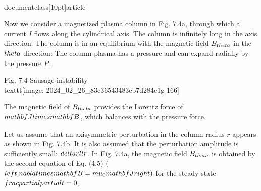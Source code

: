 \\documentclass[10pt]{article}
\begin{document}
{{{{Now we consider a magnetized plasma column in Fig. 7.4a, through which a current $I$ flows along the cylindrical axis. The column is infinitely long in the axis direction. The column is in an equilibrium with the magnetic field $B_{\\theta}$ in the $\\theta$ direction: The column plasma has a pressure and can expand radially by the pressure $P$.

Fig. 7.4 Sausage instability
\\texttt{[image: 2024\_02\_26\_83e36543483eb7d284c1g-166]}

The magnetic field of $B_{\\theta}$ provides the Lorentz force of $\\mathbf{J} \\times \\mathbf{B}$, which balances with the pressure force.

Let us assume that an axisymmetric perturbation in the column radius $r$ appears as shown in Fig. 7.4b. It is also assumed that the perturbation amplitude is sufficiently small: $\\delta r \\ll r$. In Fig. 7.4a, the magnetic field $B_{\\theta}$ is obtained by the second equation of Eq. (4.5) ( $\\left.\\nabla \\times \\mathbf{B}=\\mu_{0} \\mathbf{J}\\right)$ for the steady state $\\frac{\\partial}{\\partial t}=0$.

\\[
\\begin{array}{r}
\\mu_{0} I=\\int B_{\\theta} 2 \\pi d r=2 \\pi r B_{\\theta} \\\\
\\therefore \\quad B_{\\theta}=\\mu_{0} I / 2 \\pi r \\tag{7.39}
\\end{array}
\\]

}}}}
\end{document}
